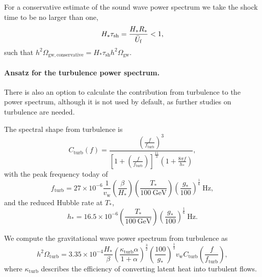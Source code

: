 \documentclass[10pt]{article}
\begin{document}
For a conservative estimate of the sound wave power spectrum we take the shock time to be no larger than one,
\begin{equation}
    H_*\tau_\mathrm{sh}=\frac{H_*R_*}{\Bar{U}_\mathrm{f}}<1,
\end{equation}
such that $h^2\Omega_\mathrm{gw,conservative} = H_*\tau_\mathrm{sh} h^2\Omega_\mathrm{gw}$.

\paragraph{Ansatz for the turbulence power spectrum.}
There is also an option to calculate the contribution from turbulence to the power spectrum, although it is not used by default, as further studies on turbulence are needed.

The spectral shape from turbulence is \cite{weir18}
\begin{equation}
    C_\mathrm{turb}(f) = \frac{\left(\frac{f}{f_\mathrm{turb}}\right)^3}{\left[1+\left(\frac{f}{f_\mathrm{turb}}\right)\right]^{\frac{11}{3}} \left(1+\frac{8\pi f}{h_*}\right)},
\end{equation}
with the peak frequency today of
\begin{equation}
    f_\mathrm{turb} = 27\times10^{-6} \frac{1}{v_\mathrm{w}} \left(\frac{\beta}{H_*}\right) \left(\frac{T_*}{100 \ \mathrm{GeV}}\right) \left(\frac{g_*}{100}\right)^{\frac{1}{6}} \ \mathrm{Hz},
\end{equation}
and the reduced Hubble rate at $T_*$,
\begin{equation}
    h_* = 16.5\times10^{-6} \left(\frac{T_*}{100 \ \mathrm{GeV}}\right) \left(\frac{g_*}{100}\right)^{\frac{1}{6}} \ \mathrm{Hz}.
\end{equation}

We compute the gravitational wave power spectrum from turbulence as \cite{weir18}
\begin{equation}
    h^2\Omega_\mathrm{turb} = 3.35\times10^{-4} \frac{H_*}{\beta} \left(\frac{\kappa_\mathrm{turb}\alpha}{1+\alpha}\right)^{\frac{3}{2}} \left(\frac{100}{g_*}\right)^{\frac{1}{3}} v_\mathrm{w} C_\mathrm{turb}\left(\frac{f}{f_\mathrm{turb}}\right),
\end{equation}
where $\kappa_\mathrm{turb}$ describes the efficiency of converting latent heat into turbulent flows.

\end{document}

